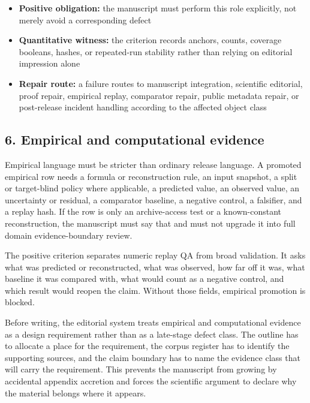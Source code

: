 \begin{itemize}[leftmargin=1.8em]

\item \textbf{Positive obligation:} the manuscript must perform this role explicitly, not merely avoid a corresponding defect

\item \textbf{Quantitative witness:} the criterion records anchors, counts, coverage booleans, hashes, or repeated-run stability rather than relying on editorial impression alone

\item \textbf{Repair route:} a failure routes to manuscript integration, scientific editorial, proof repair, empirical replay, comparator repair, public metadata repair, or post-release incident handling according to the affected object class

\end{itemize}

\subsection{6. Empirical and computational evidence}

Empirical language must be stricter than ordinary release language. A promoted empirical row needs a formula or reconstruction rule, an input snapshot, a split or target-blind policy where applicable, a predicted value, an observed value, an uncertainty or residual, a comparator baseline, a negative control, a falsifier, and a replay hash. If the row is only an archive-access test or a known-constant reconstruction, the manuscript must say that and must not upgrade it into full domain evidence-boundary review.


The positive criterion separates numeric replay QA from broad validation. It asks what was predicted or reconstructed, what was observed, how far off it was, what baseline it was compared with, what would count as a negative control, and which result would reopen the claim. Without those fields, empirical promotion is blocked.


Before writing, the editorial system treats empirical and computational evidence as a design requirement rather than as a late-stage defect class. The outline has to allocate a place for the requirement, the corpus register has to identify the supporting sources, and the claim boundary has to name the evidence class that will carry the requirement. This prevents the manuscript from growing by accidental appendix accretion and forces the scientific argument to declare why the material belongs where it appears.


